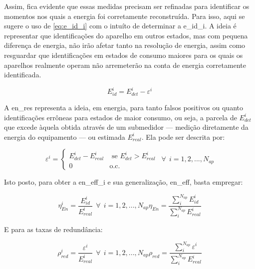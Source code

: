 Assim, fica evidente que essas medidas precisam ser refinadas para
identificar os momentos nos quais a energia foi corretamente
reconstruída. Para isso, aqui se sugere o uso de \ref{eq:e_id_i} com
o intuíto de determinar a \gls{e_id_i}. A ideia
é representar que identificações do aparelho em outros estados, mas
com pequena diferença de energia, não irão afetar tanto na resolução
de energia, assim como resguardar que identificações em estados de
consumo maiores para os quais os aparelhos realmente operam não
arremeterão na conta de energia corretamente identificada.

\begin{equation}\label{eq:e_id_i}
E_{id}^i = E_{det}^i-\varepsilon^i
\end{equation}

A \gls{en_res} representa a ideia, em energia, para tanto falsos
positivos ou quanto identificações errôneas para estados de maior
consumo, ou seja, a parcela de $E_{det}^i$ que excede àquela obtida
através de um submedidor --- medição diretamente da energia do
equipamento --- ou estimada $E_{real}^i$. Ela pode ser descrita
por:

\begin{equation}\label{eq:en_res}
\varepsilon^i = \left\{\begin{array}{rl}
 E_{det}^i - E_{real}^i &\mbox{ se $E_{det}^i>E_{real}^i$} \\
 0 &\mbox{o.c.}
\end{array} \right. ~~ \forall ~~ i = 1,2,...,N_{ap}
\end{equation}

Isto posto, para obter a \gls{en_eff_i} e sua generalização,
\gls{en_eff}, basta empregar:

\begin{subequations}
\begin{equation}\label{eq:en_eff_i}
\eta_{En}^i = \frac{E_{id}^i}{E_{real}^i} ~~ \forall ~~ i =
1,2,...,N_{ap}
\end{equation}
\begin{equation}\label{eq:en_eff}
\eta_{En} = \frac{\sum_{i}^{N_{ap}}E_{id}^i}{\sum_{i}^{N_{ap}}E_{real}^i}
\end{equation}
\end{subequations}

E para as taxas de redundância:

\begin{subequations}
\begin{equation}\label{eq:p_red_i}
\rho_{red}^i = \frac{\varepsilon^i}{E_{real}^i} ~~ \forall ~~ i =
1,2,...,N_{ap}
\end{equation}
\begin{equation}\label{eq:p_red}
\rho_{red} = \frac{\sum_{i}^{N_{ap}}\varepsilon^i}{\sum_{i}^{N_{ap}}E_{real}^i}
\end{equation}
\end{subequations}

